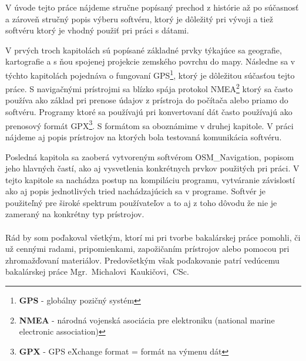 V úvode tejto práce nájdeme stručne popísaný prechod z histórie až po súčasnosť a zároveň stručný popis výberu softvéru, ktorý je dôležitý pri vývoji a tiež softvéru ktorý je vhodný použiť pri práci s dátami. 

V prvých troch kapitolách sú popísané základné prvky týkajúce sa geografie, kartografie a s ňou spojenej projekcie zemského povrchu do mapy. Následne sa v týchto kapitolách pojednáva o fungovaní GPS\footnote{\textbf{GPS} - globálny pozičný systém}, ktorý je dôležitou súčasťou tejto práce. S navigačnými prístrojmi sa blízko spája protokol NMEA\footnote{\textbf{NMEA} - národná vojenská asociácia pre elektroniku (national marine electronic association)} ktorý sa často používa ako základ pri prenose údajov z prístroja do počítača alebo priamo do softvéru. Programy ktoré sa používajú pri konvertovaní dát často používajú ako prenosový formát GPX\footnote{\textbf{GPX} - GPS eXchange format = formát na výmenu dát}. S formátom sa oboznámime v druhej kapitole. V práci nájdeme aj popis prístrojov na ktorých bola testovaná komunikácia softvéru. 

Posledná kapitola sa zaoberá vytvoreným softvérom OSM\_Navigation, popisom jeho hlavných častí, ako aj vysvetlenia konkrétnych prvkov použitých pri práci. V tejto kapitole sa nachádza postup na kompiláciu programu, vytváranie závislostí ako aj popis jednotlivých tried nachádzajúcich sa v programe. Softvér je použiteľný pre široké spektrum používateľov a to aj z toho dôvodu že nie je zameraný na konkrétny typ prístrojov.

\paragraph{}
Rád by som poďakoval všetkým, ktorí mi pri tvorbe bakalárskej práce pomohli, či 
už cennými radami, pripomienkami, zapožičaním prístrojov alebo pomocou pri zhromažďovaní materiálov. 
Predovšetkým však poďakovanie patrí vedúcemu bakalárskej práce \mbox{Mgr.~Michalovi Kaukičovi,~CSc.}
